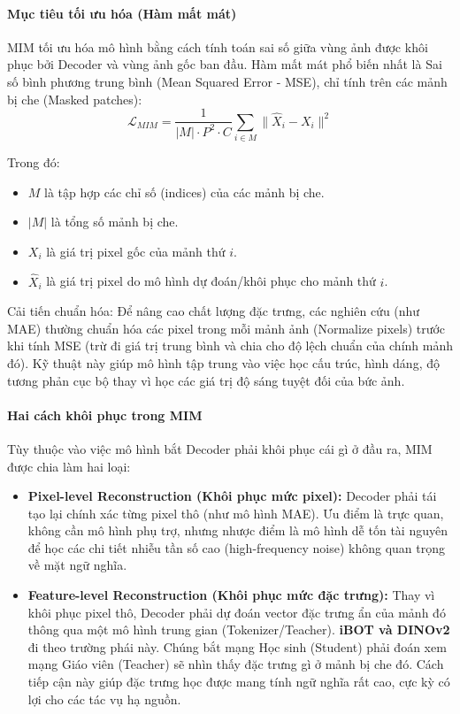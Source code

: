 \paragraph{Mục tiêu tối ưu hóa (Hàm mất mát)}
MIM tối ưu hóa mô hình bằng cách tính toán sai số giữa vùng ảnh được khôi phục bởi Decoder và vùng ảnh gốc ban đầu. Hàm mất mát phổ biến nhất là Sai số bình phương trung bình (Mean Squared Error - MSE), chỉ tính trên các mảnh bị che (Masked patches): $$\mathcal{L}_{MIM} = \dfrac{1}{|M| \cdot P^2 \cdot C} \sum_{i \in M} \| \hat{X}_i - X_i \|^2$$

Trong đó:
\begin{itemize}
    \item $M$ là tập hợp các chỉ số (indices) của các mảnh bị che.
    \item $|M|$ là tổng số mảnh bị che.
    \item $X_i$ là giá trị pixel gốc của mảnh thứ $i$.
    \item $\hat{X}_i$ là giá trị pixel do mô hình dự đoán/khôi phục cho mảnh thứ $i$.
\end{itemize}

Cải tiến chuẩn hóa: Để nâng cao chất lượng đặc trưng, các nghiên cứu (như MAE) thường chuẩn hóa các pixel trong mỗi mảnh ảnh (Normalize pixels) trước khi tính MSE (trừ đi giá trị trung bình và chia cho độ lệch chuẩn của chính mảnh đó). Kỹ thuật này giúp mô hình tập trung vào việc học cấu trúc, hình dáng, độ tương phản cục bộ thay vì học các giá trị độ sáng tuyệt đối của bức ảnh.
\paragraph{Hai cách khôi phục trong MIM}
Tùy thuộc vào việc mô hình bắt Decoder phải khôi phục cái gì ở đầu ra, MIM được chia làm hai loại:
\begin{itemize}
    \item \textbf{Pixel-level Reconstruction (Khôi phục mức pixel):} Decoder phải tái tạo lại chính xác từng pixel thô (như mô hình MAE). Ưu điểm là trực quan, không cần mô hình phụ trợ, nhưng nhược điểm là mô hình dễ tốn tài nguyên để học các chi tiết nhiễu tần số cao (high-frequency noise) không quan trọng về mặt ngữ nghĩa.
    \item \textbf{Feature-level Reconstruction (Khôi phục mức đặc trưng):} Thay vì khôi phục pixel thô, Decoder phải dự đoán vector đặc trưng ẩn của mảnh đó thông qua một mô hình trung gian (Tokenizer/Teacher). \textbf{iBOT và DINOv2} đi theo trường phái này. Chúng bắt mạng Học sinh (Student) phải đoán xem mạng Giáo viên (Teacher) sẽ nhìn thấy đặc trưng gì ở mảnh bị che đó. Cách tiếp cận này giúp đặc trưng học được mang tính ngữ nghĩa rất cao, cực kỳ có lợi cho các tác vụ hạ nguồn.
\end{itemize}

